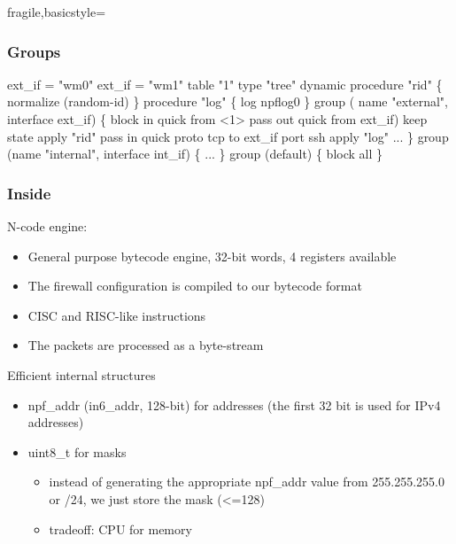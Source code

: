 \documentclass[magyar]{beamer}
\begin{document}
\begin{frame}{fragile,basicstyle=\ttfamily}
\frametitle{Groups}
\begin{semiverbatim}
ext\_if = "wm0" \newline
ext\_if = "wm1" \newline
table "1" type "tree" dynamic
\newline
procedure "rid" \{ normalize (random-id) \} \newline
procedure "log" \{ log npflog0 \} \newline
group ( name "external", interface \textdollar ext\_if) \{ \newline
	block in quick from <1> \newline
	pass out quick from \textdollar ext\_if) keep state apply "rid"
	pass in quick proto tcp to \textdollar ext\_if port ssh apply "log" \newline
       ...\newline
\} \newline
group (name "internal", interface \textdollar int\_if) \{ \newline
   ...\newline
\} \newline
group (default) \{ block all \}
\end{semiverbatim}
\end{frame}

\begin{frame}
\frametitle{Inside}
N-code engine:
\begin{itemize}
	\item General purpose bytecode engine, 32-bit words, 4 registers available
	\item The firewall configuration is compiled to our bytecode format
	\item CISC and RISC-like instructions
	\item The packets are processed as a byte-stream
\end{itemize}
Efficient internal structures
\begin{itemize}
	\item npf\_addr (in6\_addr, 128-bit) for addresses (the first 32 bit is used for IPv4 addresses)
	\item uint8\_t for masks
	\begin{itemize}
		\item instead of generating the appropriate npf\_addr value from  255.255.255.0 or /24, we just store
the mask (<=128)
		\item tradeoff: CPU for memory
	\end{itemize}
\end{itemize}
\end{frame}
\end{document}
